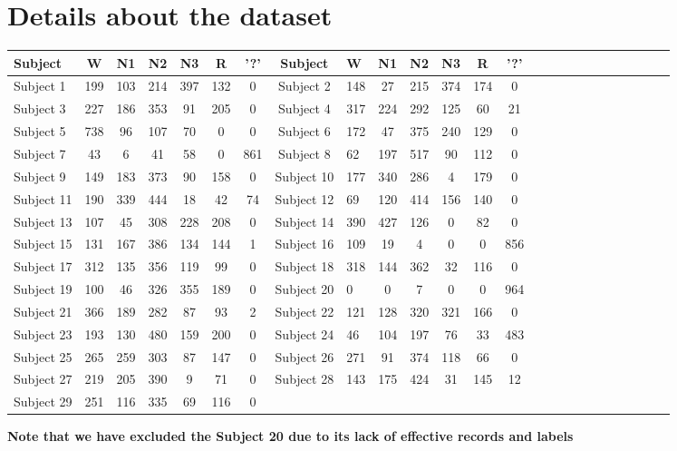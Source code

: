 \documentclass[journal]{IEEEtran}
\begin{document}
\section{Details about the dataset}
\vspace{0.3cm}
\renewcommand{\arraystretch}{2}
\centering
\begin{tabular}{lccccccclccccccclcccccccl}

Subject & W & N1 & N2 & N3 & R & '?' & Subject & W & N1 & N2 & N3 & R & '?' \\ 
\midrule
Subject 1 & 199 & 103 & 214 & 397 & 132 & 0 & 
Subject 2 & 148 & 27 & 215 & 374 & 174 & 0 \\
Subject 3 & 227 & 186 & 353 & 91 & 205 & 0 & 
Subject 4 & 317 & 224 & 292 & 125 & 60 & 21 \\
Subject 5 & 738 & 96 & 107 & 70 & 0 & 0 &
Subject 6 & 172 & 47 & 375 & 240 & 129 & 0 \\ 
Subject 7 & 43 & 6 & 41 & 58 & 0 & 861 & 
Subject 8 & 62 & 197 & 517 & 90 & 112 & 0 \\
Subject 9 & 149 & 183 & 373 & 90 & 158 & 0 & 
Subject 10 & 177 & 340 & 286 & 4 & 179 & 0 \\
Subject 11 & 190 & 339 & 444 & 18 & 42 & 74 &
Subject 12 & 69 & 120 & 414 & 156 & 140 & 0 \\ 
Subject 13 & 107 & 45 & 308 & 228 & 208 & 0 &
Subject 14 & 390 & 427 & 126 & 0 & 82 & 0 \\
Subject 15 & 131 & 167 & 386 & 134 & 144 & 1 & 
Subject 16 & 109 & 19 & 4 & 0 & 0 & 856 \\
Subject 17 & 312 & 135 & 356 & 119 & 99 & 0 &
Subject 18 & 318 & 144 & 362 & 32 & 116 & 0 \\   
Subject 19 & 100 & 46 & 326 & 355 & 189 & 0 &
Subject 20 & 0 & 0 & 7 & 0 & 0 & 964 \\
Subject 21 & 366 & 189 & 282 & 87 & 93 & 2 &
Subject 22 & 121 & 128 & 320 & 321 & 166 & 0 \\
Subject 23 & 193 & 130 & 480 & 159 & 200 & 0 &
Subject 24 & 46 & 104 & 197 & 76 & 33 & 483 \\ 
Subject 25 & 265 & 259 & 303 & 87 & 147 & 0 &
Subject 26 & 271 & 91 & 374 & 118 & 66 & 0 \\
Subject 27 & 219 & 205 & 390 & 9 & 71 & 0 &
Subject 28 & 143 & 175 & 424 & 31 & 145 & 12 \\
Subject 29 & 251 & 116 & 335 & 69 & 116 & 0 & & & & & & & \\
\end{tabular}
 
\vspace{0.7cm}
\textbf{Note that we have excluded the Subject 20 due to its lack of effective records and labels}




























\end{document}
